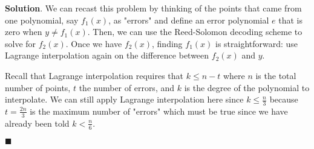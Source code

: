 \documentclass[12pt]{article}
\theoremstyle{definition}
\newenvironment{s}{%
        \begin{trivlist} \item \textbf{Solution}. }{%
            \hspace*{\fill} $\blacksquare$\end{trivlist}}%
\begin{document}
{\begin{s}
We can recast this problem by thinking of the points that came from one polynomial, say $f_{1}(x)$, as "errors" and define an error polynomial $e$ that is zero when $y \neq f_{1}(x)$. Then, we can use the Reed-Solomon decoding scheme to solve for $f_{2}(x)$. Once we have $f_{2}(x)$, finding $f_{1}(x)$ is straightforward: use Lagrange interpolation again on the difference between $f_{2}(x)$ and $y$. 

Recall that Lagrange interpolation requires that $k\leq n-t$ where $n$ is the total number of points, $t$ the number of errors, and $k$ is the degree of the polynomial to interpolate. We can still apply Lagrange interpolation here since $k \leq \frac{n}{3}$ because $t=\frac{2n}{3}$ is the maximum number of "errors" which must be true since we have already been told $k < \frac{n}{6}$.


\end{s}
\end{document}
